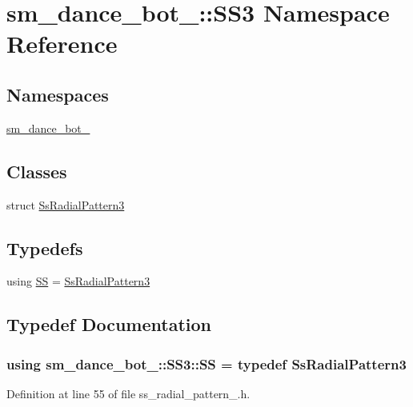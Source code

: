 \hypertarget{namespacesm__dance__bot__3_1_1SS3}{}\section{sm\+\_\+dance\+\_\+bot\+\_\+:\+:S\+S3 Namespace Reference}
\label{namespacesm__dance__bot__3_1_1SS3}
\subsection*{Namespaces}
\begin{DoxyCompactItemize}
\item 
 \hyperlink{namespacesm__dance__bot__3_1_1SS3_1_1sm__dance__bot__3}{sm\+\_\+dance\+\_\+bot\+\_}
\end{DoxyCompactItemize}
\subsection*{Classes}
\begin{DoxyCompactItemize}
\item 
struct \hyperlink{structsm__dance__bot__3_1_1SS3_1_1SsRadialPattern3}{Ss\+Radial\+Pattern3}
\end{DoxyCompactItemize}
\subsection*{Typedefs}
\begin{DoxyCompactItemize}
\item 
using \hyperlink{namespacesm__dance__bot__3_1_1SS3_a1980df51e516f1d0f9191faabf472409}{SS} = \hyperlink{structsm__dance__bot__3_1_1SS3_1_1SsRadialPattern3}{Ss\+Radial\+Pattern3}
\end{DoxyCompactItemize}


\subsection{Typedef Documentation}
\subsubsection[{\texorpdfstring{SS}{SS}}]{\setlength{\rightskip}{0pt plus 5cm}using {\bf sm\+\_\+dance\+\_\+bot\+\_\+::\+S\+S3\+::\+SS} = typedef {\bf Ss\+Radial\+Pattern3}}\hypertarget{namespacesm__dance__bot__3_1_1SS3_a1980df51e516f1d0f9191faabf472409}{}\label{namespacesm__dance__bot__3_1_1SS3_a1980df51e516f1d0f9191faabf472409}


Definition at line 55 of file ss\+\_\+radial\+\_\+pattern\+\_.\+h.

